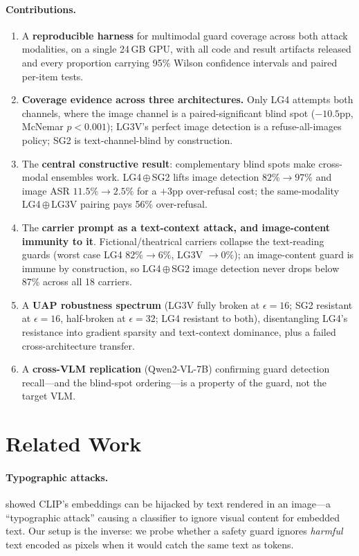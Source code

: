 \documentclass[11pt]{article}
\newcommand{\ens}{\ensuremath{\oplus}}    %
\begin{document}
\paragraph{Contributions.}
\begin{enumerate}[itemsep=1pt,topsep=2pt]
  \item[(1)] A \textbf{reproducible harness} for multimodal guard coverage across both attack modalities, on a single 24\,GB GPU, with all code and result artifacts released and every proportion carrying 95\% Wilson confidence intervals and paired per-item tests.
  \item[(2)] \textbf{Coverage evidence across three architectures.} Only LG4 attempts both channels, where the image channel is a paired-significant blind spot ($-10.5$pp, McNemar $p<0.001$); LG3V's perfect image detection is a refuse-all-images policy; SG2 is text-channel-blind by construction.
  \item[(3)] The \textbf{central constructive result}: complementary blind spots make cross-modal ensembles work. LG4\,\ens\,SG2 lifts image detection $82\%\to97\%$ and image ASR $11.5\%\to2.5\%$ for a $+3$pp over-refusal cost; the same-modality LG4\,\ens\,LG3V pairing pays 56\% over-refusal.
  \item[(4)] The \textbf{carrier prompt as a text-context attack, and image-content immunity to it}. Fictional/theatrical carriers collapse the text-reading guards (worst case LG4 $82\%\to6\%$, LG3V $\to0\%$); an image-content guard is immune by construction, so LG4\,\ens\,SG2 image detection never drops below 87\% across all 18 carriers.
  \item[(5)] A \textbf{UAP robustness spectrum} (LG3V fully broken at $\epsilon{=}16$; SG2 resistant at $\epsilon{=}16$, half-broken at $\epsilon{=}32$; LG4 resistant to both), disentangling LG4's resistance into gradient sparsity and text-context dominance, plus a failed cross-architecture transfer.
  \item[(6)] A \textbf{cross-VLM replication} (Qwen2-VL-7B) confirming guard detection recall---and the blind-spot ordering---is a property of the guard, not the target VLM.
\end{enumerate}

\section{Related Work}

\paragraph{Typographic attacks.} \citet{goh2021multimodal} showed CLIP's embeddings can be hijacked by text rendered in an image---a ``typographic attack'' causing a classifier to ignore visual content for embedded text. Our setup is the inverse: we probe whether a safety guard ignores \emph{harmful} text encoded as pixels when it would catch the same text as tokens.
\end{document}
